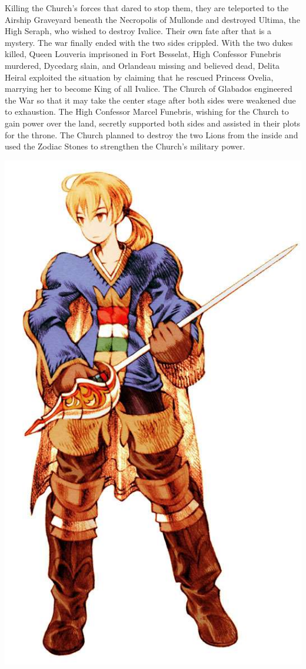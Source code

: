 Killing the Church's forces that dared to stop them, they are teleported to the Airship Graveyard beneath the Necropolis of Mullonde and destroyed Ultima, the High Seraph, who wished to destroy Ivalice. 
Their own fate after that is a mystery.
The war finally ended with the two sides crippled. 
With the two dukes killed, Queen Louveria imprisoned in Fort Besselat, High Confessor Funebris murdered, Dycedarg slain, and Orlandeau missing and believed dead, Delita Heiral exploited the situation by claiming that he rescued Princess Ovelia, marrying her to become King of all Ivalice.
The Church of Glabados engineered the War so that it may take the center stage after both sides were weakened due to exhaustion. 
The High Confessor Marcel Funebris, wishing for the Church to gain power over the land, secretly supported both sides and assisted in their plots for the throne. 
The Church planned to destroy the two Lions from the inside and used the Zodiac Stones to strengthen the Church's military power.
%
\ofpar
%
\\
%
\begin{center}\includegraphics[width=0.85\columnwidth]{./art/worldbook/ramza.jpg}\end{center}
